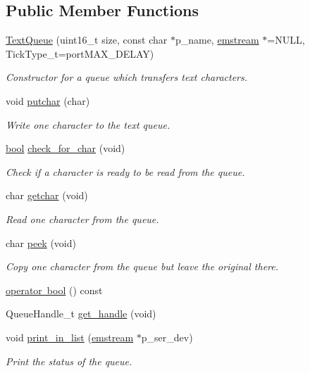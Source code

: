 \subsection*{Public Member Functions}
\begin{DoxyCompactItemize}
\item 
\mbox{\hyperlink{class_text_queue_a2823917efdf4439cc4f70456b8ddf4bd}{Text\+Queue}} (uint16\+\_\+t size, const char $\ast$p\+\_\+name, \mbox{\hyperlink{classemstream}{emstream}} $\ast$=N\+U\+LL, Tick\+Type\+\_\+t=port\+M\+A\+X\+\_\+\+D\+E\+L\+AY)
\begin{DoxyCompactList}\small\item\em Constructor for a queue which transfers text characters. \end{DoxyCompactList}\item 
void \mbox{\hyperlink{class_text_queue_a917e1c134d4ef6591f832e2706a67cac}{putchar}} (char)
\begin{DoxyCompactList}\small\item\em Write one character to the text queue. \end{DoxyCompactList}\item 
\mbox{\hyperlink{group___motor___boolean___type_ga0ecf26b576b9a54eca656b9be7ba6a06}{bool}} \mbox{\hyperlink{class_text_queue_a4b520515f1110e8d592a3b5a5abc615b}{check\+\_\+for\+\_\+char}} (void)
\begin{DoxyCompactList}\small\item\em Check if a character is ready to be read from the queue. \end{DoxyCompactList}\item 
char \mbox{\hyperlink{class_text_queue_ab682ee4d2cbad87e9496ca424fa03b0a}{getchar}} (void)
\begin{DoxyCompactList}\small\item\em Read one character from the queue. \end{DoxyCompactList}\item 
char \mbox{\hyperlink{class_text_queue_a92ed0a74b86ce1ea2dd426c92f3230c6}{peek}} (void)
\begin{DoxyCompactList}\small\item\em Copy one character from the queue but leave the original there. \end{DoxyCompactList}\item 
\mbox{\hyperlink{class_text_queue_a0fd3c395a00b5da3bb866137466d878a}{operator bool}} () const
\item 
Queue\+Handle\+\_\+t \mbox{\hyperlink{class_text_queue_a0f83656a176a1a4d71ef825b8a423ab7}{get\+\_\+handle}} (void)
\item 
void \mbox{\hyperlink{class_text_queue_aeef41a1bc3486d98fb31cba9ce539d0d}{print\+\_\+in\+\_\+list}} (\mbox{\hyperlink{classemstream}{emstream}} $\ast$p\+\_\+ser\+\_\+dev)
\begin{DoxyCompactList}\small\item\em Print the status of the queue. \end{DoxyCompactList}\end{DoxyCompactItemize}

